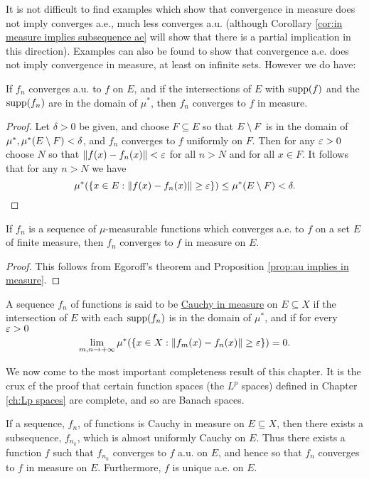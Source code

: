 It is not difficult to find examples which show that convergence in measure does not imply converges a.e., much less converges a.u. (although Corollary \ref{cor:in measure implies subsequence ae} will show that there is a partial implication in this direction). Examples can also be found to show that convergence a.e. does not imply convergence in measure, at least on infinite sets. However we do have:

\begin{proposition}
\label{prop:au implies in measure}
If $f_n$ converges a.u. to $f$ on $E$, and if the intersections of $E$ with $\operatorname{supp}(f)$ and the $\operatorname{supp}(f_n)$ are in the domain of $\mu^*$, then $f_n$ converges to $f$ in measure. 
\end{proposition}

\begin{proof}
Let $\delta>0$ be given, and choose $F \subseteq E$ so that $E\setminus F$ is in the domain of $\mu^*, \mu^*(E\setminus F)<\delta$, and $f_n$ converges to $f$ uniformly on $F$. Then for any $\varepsilon>0$ choose $N$ so that $\norm{f(x)-f_n(x)}<\varepsilon$ for all $n>N$ and for all $x \in F$. It follows that for any $n>N$ we have $$\mu^*(\left\{x \in E:\norm{f(x)-f_n(x)} \geq \varepsilon\right\})\leq\mu^*(E\setminus F)<\delta.$$
\end{proof}

\begin{corollary}
If $f_n$ is a sequence of $\mu$-measurable functions which converges a.e. to $f$ on a set $E$ of finite measure, then $f_n$ converges to $f$ in measure on $E$.
\end{corollary}

\begin{proof}
This follows from Egoroff's theorem and Proposition \ref{prop:au implies in measure}.
\end{proof}

\begin{definition}
A sequence $f_n$ of functions is said to be \underline{Cauchy in measure} on $E \subseteq X$ if the intersection of $E$ with each $\operatorname{supp}(f_n)$ is in the domain of $\mu^*$, and if for every $\varepsilon>0$ $$\lim_{m,n\to+\infty}\mu^*(\left\{x\in X:\norm{f_m(x)-f_n(x)}\geq\varepsilon\right\})=0.$$
\end{definition}

We now come to the most important completeness result of this chapter. It is the crux cf the proof that certain function spaces (the $L^p$ spaces) defined in Chapter \ref{ch:Lp spaces} are complete, and so are Banach spaces.

\begin{theorem}
\label{thm:riesz weyl}
If a sequence, $f_n$, of functions is Cauchy in measure on $E\subseteq X$, then there exists a subsequence, $f_{n_k}$, which is almost uniformly Cauchy on $E$. Thus there exists a function $f$ such that $f_{n_k}$ converges to $f$ a.u. on $E$, and hence so that $f_n$ converges to $f$ in measure on $E$. Furthermore, $f$ is unique a.e. on $E$.
\end{theorem}

